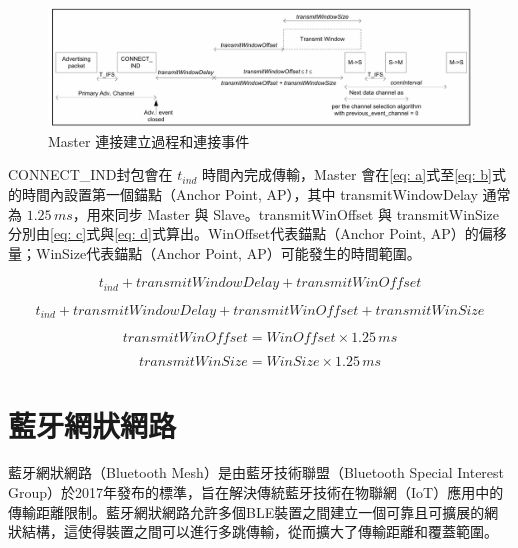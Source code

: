 \begin{ZhChapter}
\begin{figure}[H]
    \centering
    \includegraphics[width = 1\textwidth]{image/Master 連接建立過程和連接事件.png}
    \caption{Master 連接建立過程和連接事件\cite{bluetooth2016core}}
    \label{fig: Master 連接建立過程和連接事件}
\end{figure}

CONNECT\_IND封包會在 $t_{ind}$ 時間內完成傳輸，Master 會在\ref{eq: a}式至\ref{eq: b}式的時間內設置第一個錨點（Anchor Point, AP），其中 transmitWindowDelay 通常為 $1.25\,{ms}$，用來同步 Master 與 Slave。transmitWinOffset 與 transmitWinSize 分別由\ref{eq: c}式與\ref{eq: d}式算出。WinOffset代表錨點（Anchor Point, AP）的偏移量；WinSize代表錨點（Anchor Point, AP）可能發生的時間範圍\cite{10.1145/3412382.3458271}。

\begin{equation}
t_{ind} + transmitWindowDelay + transmitWinOffset
\label{eq: a}
\end{equation}

\begin{equation}
t_{ind} + transmitWindowDelay + transmitWinOffset + transmitWinSize
\label{eq: b}
\end{equation}

\begin{equation}
transmitWinOffset = WinOffset \times 1.25\, ms
\label{eq: c}
\end{equation}

\begin{equation}
transmitWinSize = WinSize \times 1.25\, ms 
\label{eq: d}
\end{equation}

\section{藍牙網狀網路}

藍牙網狀網路（Bluetooth Mesh）是由藍牙技術聯盟（Bluetooth Special Interest Group）於2017年發布的標準，旨在解決傳統藍牙技術在物聯網（IoT）應用中的傳輸距離限制。藍牙網狀網路允許多個BLE裝置之間建立一個可靠且可擴展的網狀結構，這使得裝置之間可以進行多跳傳輸，從而擴大了傳輸距離和覆蓋範圍。


\end{ZhChapter}
